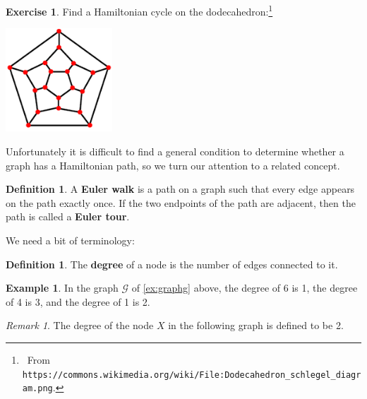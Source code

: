 \documentclass[a4paper, 10pt]{amsart}
\theoremstyle{definition}
\newtheorem{defn}[thm]{Definition}
\newtheorem{ex}[thm]{Example}
\newtheorem{exercise}[thm]{Exercise}
\theoremstyle{remark}
\newtheorem{rem}[thm]{Remark}
\begin{document}
\begin{exercise}
  Find a Hamiltonian cycle on the dodecahedron:\footnote{~From \texttt{https://commons.wikimedia.org/wiki/File:Dodecahedron\_schlegel\_diagram.png}.}
  \begin{center}
    \includegraphics[width=0.3\textwidth]{dodec}
  \end{center}
\end{exercise}

Unfortunately it is difficult to find a general condition to determine whether a graph has a Hamiltonian path, so we turn
our attention to a related concept.

\begin{defn}
  A \textbf{Euler walk} is a path on a graph such that every edge appears on the path exactly once. If the two endpoints
  of the path are adjacent, then the path is called a \textbf{Euler tour}.
\end{defn}

We need a bit of terminology:

\begin{defn}
  The \textbf{degree} of a node is the number of edges connected to it.
\end{defn}

\begin{ex}
  In the graph $ \mathcal{G} $ of \cref{ex:graphg} above, the degree of 6 is 1, the degree of 4 is 3, and the degree of 1 is 2.
\end{ex}

\begin{rem}
  The degree of the node $ X $ in the following graph is defined to be 2.
  \begin{center}
  \end{center}
\end{rem}
\end{document}
